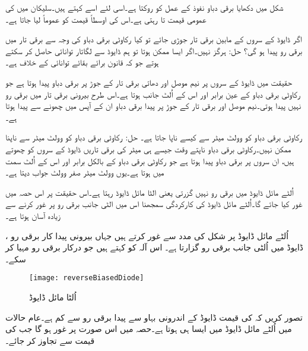 شکل میں دکھایا برقی دباو  نفوذ کے عمل کو روکتا ہے۔اسی لئے اسے   کہتے ہیں۔سلیکان میں  کی عمومی  قیمت  تا  رہتی ہے۔اس کی اوسطاً قیمت کو عموماً  لیا جاتا ہے۔

اگر ڈایوڈ کے سروں کے مابین برقی تار جوڑی جائے تو کیا رکاوٹی برقی دباو کی وجہ سے برقی تار میں برقی رو پیدا ہو گی؟
حل:	ہرگز نہیں۔اگر ایسا ممکن ہوتا تو ہم ڈایوڈ سے لگاتار توانائی حاصل کر سکتے ہوتے جو کہ قانون برائے بقائے توانائی کے خلاف ہے۔


حقیقت میں ڈایوڈ کے سروں پر نیم موصل اور دھاتی برقی تار کے جوڑ  پر برقی دباو پیدا ہوتا ہے جو رکاوٹی برقی دباو کے عین برابر اور اس کے اُلٹ جانب ہوتا ہے۔اس طرح بیرونی برقی تار میں برقی رو نہیں پیدا ہوتی۔نیم موصل اور برقی تار کے جوڑ پر پیدا برقی دباو ان کے آپس میں چھونے سے پیدا ہوتا ہے۔ 	

رکاوٹی برقی دباو  کو وولٹ میٹر  سے کیسے ناپا جاتا ہے۔
حل:	رکاوٹی برقی دباو کو وولٹ میٹر سے ناپنا ممکن نہیں۔رکاوٹی برقی دباو ناپتے وقت جیسے ہی میٹر کی برقی تاریں ڈایوڈ کے سروں کو چھوتے ہیں، ان سروں پر  برقی دباو پیدا ہوتا ہے جو رکاوٹی برقی دباو کے بالکل برابر اور اس کے اُلٹ سمت میں ہوتا ہے۔یوں وولٹ میٹر صفر وولٹ جواب دیتا ہے۔



	اُلٹے مائل ڈایوڈ   میں برقی رو نہیں گزرتی یعنی الٹا مائل  ڈایوڈ   رہتا ہے۔اس حقیقت پر اس حصہ میں غور کیا جائے گا۔اُلٹے مائل ڈایوڈ کی کارکردگی سمجھنا اس میں الٹی جانب برقی رو پر غور کرنے سے زیادہ آسان ہوتا ہے۔

اُلٹے مائل ڈایوڈ   پر شکل   کی مدد سے غور کرتے ہیں جہاں بیرونی پیدا کار برقی رو ، ڈایوڈ میں اُلٹی جانب برقی رو  گزارتا ہے۔ اس آلہ کو کہتے ہیں جو درکار برقی رو مہیا کر سکے۔
\begin{figure}
\centering
\texttt{[image: reverseBiasedDiode]}
\caption{ اُلٹا مائل ڈایوڈ}
\label{شکل_اُلٹا_مائل_ڈایوڈ}
\end{figure}
تصور کریں کہ  کی قیمت ڈایوڈ کے اندرونی بہاو سے پیدا برقی رو  سے کم ہے۔عام حالات میں اُلٹے مائل ڈایوڈ میں ایسا ہی ہوتا ہے۔حصہ   میں اس صورت پر غور ہو گا جب  کی قیمت  سے تجاوز کر جائے۔

